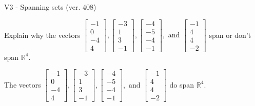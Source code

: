 \begin{exercise}
  \begin{exerciseTitle}V3 - Spanning sets (ver. 408)\end{exerciseTitle}
  \begin{exerciseStatement}
    Explain why the vectors \(\left[\begin{array}{r}
-1 \\
0 \\
-4 \\
4
\end{array}\right] , \left[\begin{array}{r}
-3 \\
1 \\
3 \\
-1
\end{array}\right] , \left[\begin{array}{r}
-4 \\
-5 \\
-4 \\
-1
\end{array}\right] , \text{ and } \left[\begin{array}{r}
-1 \\
4 \\
4 \\
-2
\end{array}\right]\) span or don't span \(\mathbb{R}^4\). 
	


  \end{exerciseStatement}
  \begin{exerciseAnswer}
   The vectors \(\left[\begin{array}{r}
-1 \\
0 \\
-4 \\
4
\end{array}\right] , \left[\begin{array}{r}
-3 \\
1 \\
3 \\
-1
\end{array}\right] , \left[\begin{array}{r}
-4 \\
-5 \\
-4 \\
-1
\end{array}\right] , \text{ and } \left[\begin{array}{r}
-1 \\
4 \\
4 \\
-2
\end{array}\right]\) 
  	 do  
	span \(\mathbb{R}^4\).
  


  \end{exerciseAnswer}
\end{exercise}